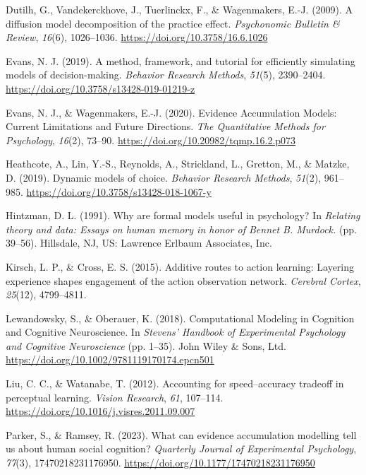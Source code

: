 \documentclass[
  man, donotrepeattitle,floatsintext]{apa6}
\newlength{\cslhangindent}
\newenvironment{CSLReferences}[2] %
 {\begin{list}{}{%
  \setlength{\itemindent}{0pt}
  \setlength{\leftmargin}{0pt}
  \setlength{\parsep}{0pt}
  \ifodd #1
   \setlength{\leftmargin}{\cslhangindent}
   \setlength{\itemindent}{-1\cslhangindent}
  \fi
  \setlength{\itemsep}{#2\baselineskip}}}
 {\end{list}}
\begin{document}
\begin{CSLReferences}{1}{0}
Dutilh, G., Vandekerckhove, J., Tuerlinckx, F., \& Wagenmakers, E.-J. (2009). A diffusion model decomposition of the practice effect. \emph{Psychonomic Bulletin \& Review}, \emph{16}(6), 1026--1036. \url{https://doi.org/10.3758/16.6.1026}

Evans, N. J. (2019). A method, framework, and tutorial for efficiently simulating models of decision-making. \emph{Behavior Research Methods}, \emph{51}(5), 2390--2404. \url{https://doi.org/10.3758/s13428-019-01219-z}

Evans, N. J., \& Wagenmakers, E.-J. (2020). Evidence {Accumulation Models}: {Current Limitations} and {Future Directions}. \emph{The Quantitative Methods for Psychology}, \emph{16}(2), 73--90. \url{https://doi.org/10.20982/tqmp.16.2.p073}

Heathcote, A., Lin, Y.-S., Reynolds, A., Strickland, L., Gretton, M., \& Matzke, D. (2019). Dynamic models of choice. \emph{Behavior Research Methods}, \emph{51}(2), 961--985. \url{https://doi.org/10.3758/s13428-018-1067-y}

Hintzman, D. L. (1991). Why are formal models useful in psychology? In \emph{Relating theory and data: {Essays} on human memory in honor of {Bennet B}. {Murdock}.} (pp. 39--56). Hillsdale, NJ, US: Lawrence Erlbaum Associates, Inc.

Kirsch, L. P., \& Cross, E. S. (2015). Additive routes to action learning: Layering experience shapes engagement of the action observation network. \emph{Cerebral Cortex}, \emph{25}(12), 4799--4811.

Lewandowsky, S., \& Oberauer, K. (2018). Computational {Modeling} in {Cognition} and {Cognitive Neuroscience}. In \emph{Stevens' {Handbook} of {Experimental Psychology} and {Cognitive Neuroscience}} (pp. 1--35). John Wiley \& Sons, Ltd. \url{https://doi.org/10.1002/9781119170174.epcn501}

Liu, C. C., \& Watanabe, T. (2012). Accounting for speed--accuracy tradeoff in perceptual learning. \emph{Vision Research}, \emph{61}, 107--114. \url{https://doi.org/10.1016/j.visres.2011.09.007}

Parker, S., \& Ramsey, R. (2023). What can evidence accumulation modelling tell us about human social cognition? \emph{Quarterly Journal of Experimental Psychology}, \emph{77}(3), 17470218231176950. \url{https://doi.org/10.1177/17470218231176950}


\end{CSLReferences}
\end{document}
